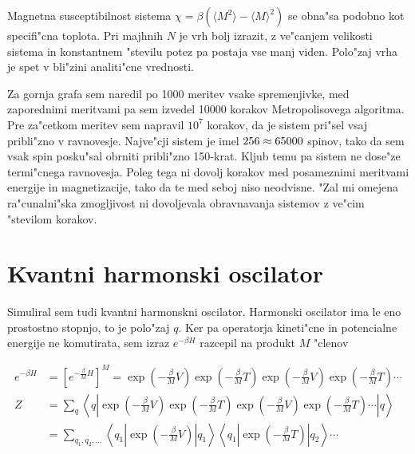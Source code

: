 \documentclass[a4paper,10pt]{article}
\begin{document}
\begin{figure}[H]
 \centering
 
\end{figure}

Magnetna susceptibilnost sistema $\chi = \beta(\langle M^2 \rangle - \langle M \rangle^2)$ se obna"sa podobno kot specifi"cna toplota. 
Pri majhnih $N$ je vrh bolj izrazit, z ve"canjem velikosti sistema in konstantnem "stevilu potez pa postaja vse manj viden. 
Polo"zaj vrha je spet v bli"zini analiti"cne vrednosti. 

Za gornja grafa sem naredil po 1000 meritev vsake spremenjivke, med zaporednimi meritvami pa sem izvedel 10000 korakov Metropolisovega algoritma. 
Pre za"cetkom meritev sem napravil $10^7$ korakov, da je sistem pri"sel vsaj pribli"zno v ravnovesje. 
Najve"cji sistem je imel $256 \time 256 \approx 65000$ spinov, tako da sem vsak spin posku"sal obrniti pribli"zno 150-krat. 
Kljub temu pa sistem ne dose"ze termi"cnega ravnovesja. 
Poleg tega ni dovolj korakov med posameznimi meritvami energije in magnetizacije, tako da te med seboj niso neodvisne. 
"Zal mi omejena ra"cunalni"ska zmogljivost ni dovoljevala obravnavanja sistemov z ve"cim "stevilom korakov. 

\section{Kvantni harmonski oscilator}

Simuliral sem tudi kvantni harmonskni oscilator. 
Harmonski oscilator ima le eno prostostno stopnjo, to je polo"zaj $q$. 
Ker pa operatorja kineti"cne in potencialne energije ne komutirata, sem izraz $e^{-\beta H}$ razcepil na produkt $M$ "clenov

\begin{align}
 e^{-\beta H} &= \left[e^{-\frac{\beta}{M}H}\right]^M = \exp\left(-{\frac{\beta}{M}V}\right) \exp\left(-{\frac{\beta}{M}T}\right) \exp\left(-{\frac{\beta}{M}V}\right) \exp\left(-{\frac{\beta}{M}T}\right) \cdots \\
 Z &= \sum_{q} \left\langle q \left|\exp\left(-{\frac{\beta}{M}V}\right) \exp\left(-{\frac{\beta}{M}T}\right) \exp\left(-{\frac{\beta}{M}V}\right) \exp\left(-{\frac{\beta}{M}T}\right) \cdots \right| q \right\rangle \\
 &= \sum_{q_1, q_2, \ldots} \left\langle q_1 \left|\exp\left(-{\frac{\beta}{M}V}\right) \right|q_1\right\rangle \left\langle q_1 \left| \exp\left(-{\frac{\beta}{M}T}\right) \right|q_2\right\rangle \cdots
\end{align}
\end{document}

